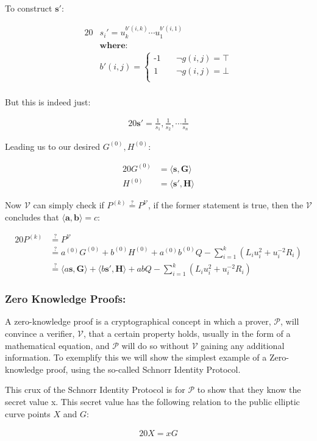 \documentclass{article}
\newcommand{\eq}[1]{\begin{alignat*}{20}#1\end{alignat*}}
\renewcommand{\vec}[1]{\boldsymbol{#1}}
\newcommand{\V}{\mathcal{V}}
\renewcommand{\P}{\mathcal{P}}
\newcommand{\dotp}[2]{\langle #1, #2 \rangle}
\begin{document}
To construct $\vec{s'}$:

\eq{
	&s_i' = u^{b'(i,k)}_k \cdots u^{b'(i,1)}_1 \\
	&\textbf{where:} \\
	&b'(i,j) = 
	\begin{cases}
		\text{-1} &\quad  \lnot g(i,j) = \top \\
		\text{1}  &\quad  \lnot g(i,j) = \bot \\
	\end{cases} \\
}

But this is indeed just:

\eq{
	\vec{s'} = \frac{1}{s_1}, \frac{1}{s_2}, \cdots \frac{1}{s_n}
}

Leading us to our desired $G^{(0)}, H^{(0)}$:

\eq{
	G^{(0)} &= \dotp{\vec{s}}{\vec{G}} \\
	H^{(0)} &= \dotp{\vec{s'}}{\vec{H}}
}

Now $\V$ can simply check if $P^{(k)} \stackrel{?}{=} P^{\V}$,
if the former statement is true, then the $\V$ concludes that
$\dotp{\vec{a}}{\vec{b}} = c$:

\eq{
	P^{(k)} &\stackrel{?}{=} P^{\V} \\
	        &\stackrel{?}{=} a^{(0)}G^{(0)} + b^{(0)}H^{(0)} + a^{(0)}b^{(0)}Q - \sum^k_{i=1} (L_i u^2_i + u^{-2}_i R_i) \\
	        &\stackrel{?}{=} \dotp{a\vec{s}}{\vec{G}} + \dotp{b\vec{s'}}{\vec{H}} + abQ - \sum^k_{i=1} (L_i u^2_i + u^{-2}_i R_i)
}

\subsubsection{Zero Knowledge Proofs:}\label{zero-knowledge}

A zero-knowledge proof is a cryptographical concept in which a prover, $\P$, will convince a verifier, $\V$, that a certain property holds, usually in the form of a mathematical equation, and $\P$ will do so without $\V$ gaining any additional information. To exemplify this we will show the simplest example of a Zero-knowledge proof, using the so-called Schnorr Identity Protocol.

This crux of the Schnorr Identity Protocol is for $\P$ to show that they know the secret value x. This secret value has the following relation to the public elliptic curve points $X$ and $G$:

\eq{
	X = xG
}
\end{document}
